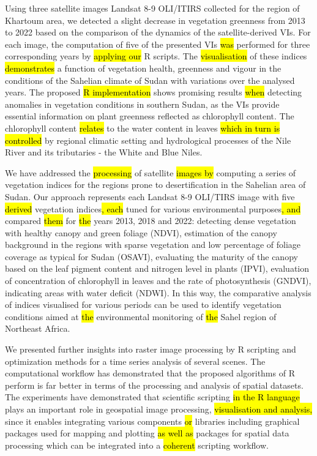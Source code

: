 \documentclass[jimaging,article,submit,pdftex,moreauthors]{Definitions/mdpi}
\begin{document}
Using three satellite images Landsat 8-9 OLI/ITIRS collected for the region of Khartoum area, we detected a slight decrease in vegetation greenness from 2013 to 2022 based on the comparison of the dynamics of the satellite-derived VIs. For each image, the computation of five of the presented VIs \hl{was} performed for three corresponding years by \hl{applying our} R scripts. The \hl{visualisation} of these indices \hl{demonstrates} a function of vegetation health, greenness and vigour in the conditions of the Sahelian climate of Sudan with variations over the analysed years. The proposed \hl{R implementation} shows promising results \hl{when} detecting anomalies in vegetation conditions in southern Sudan, as the VIs provide essential information on plant greenness reflected as chlorophyll content. The chlorophyll content \hl{relates} to the water content in leaves \hl{which in turn is controlled }by regional climatic setting and hydrological processes of the Nile River and its tributaries - the White and Blue Niles. 

We have addressed the \hl{processing} of satellite \hl{images by} computing a series of vegetation indices for the regions prone to desertification in the Sahelian area of Sudan. Our approach represents each Landsat 8-9 OLI/TIRS image with five \hl{derived} vegetation indices\hl{, each} tuned for various environmental purposes\hl{, and} compared \hl{them }for \hl{the }years 2013, 2018 and 2022: detecting dense vegetation with healthy canopy and green foliage (NDVI), estimation of the canopy background in the regions with sparse vegetation and low percentage of foliage coverage as typical for Sudan (OSAVI), evaluating the maturity of the canopy based on the leaf pigment content and nitrogen level in plants (IPVI), evaluation of concentration of chlorophyll in leaves and the rate of photosynthesis (GNDVI), indicating areas with water deficit (NDWI). In this way, the comparative analysis of indices visualised for various periods can be used to identify vegetation conditions aimed at \hl{the }environmental monitoring of \hl{the }Sahel region of Northeast Africa.

We presented further insights into raster image processing by R scripting and optimization methods for a time series analysis of several scenes. The computational workflow has demonstrated that the proposed algorithms of R perform is far better in terms of the processing and analysis of spatial datasets. The experiments have demonstrated that scientific scripting \hl{in the R language} plays an important role in geospatial image processing, \hl{visualisation and analysis,} since it enables integrating various components \hl{or} libraries including graphical packages used for mapping and plotting \hl{as well as} packages for spatial data processing which can be integrated into a \hl{coherent }scripting workflow.  
\end{document}
